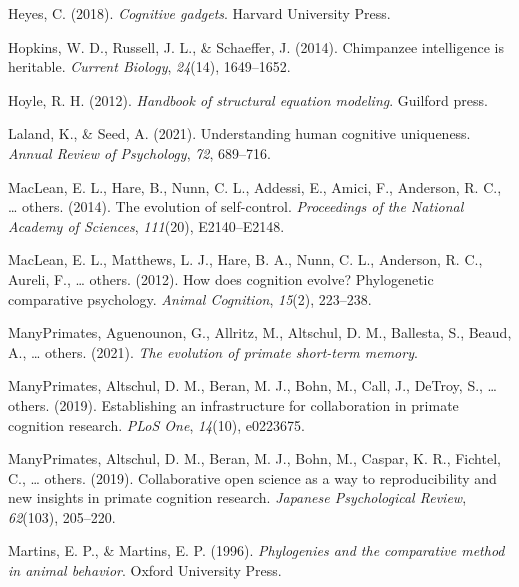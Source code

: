 \documentclass[
  man,floatsintext]{apa6}
\newlength{\cslhangindent}
\newlength{\cslentryspacingunit} %
\newenvironment{CSLReferences}[2] %
 {%
  \setlength{\parindent}{0pt}
  \ifodd #1
  \let\oldpar\par
  \def\par{\hangindent=\cslhangindent\oldpar}
  \fi
  \setlength{\parskip}{#2\cslentryspacingunit}
 }%
 {}
\begin{document}
\begin{CSLReferences}{1}{0}
\leavevmode{}%
Heyes, C. (2018). \emph{Cognitive gadgets}. Harvard University Press.

\leavevmode{}%
Hopkins, W. D., Russell, J. L., \& Schaeffer, J. (2014). Chimpanzee intelligence is heritable. \emph{Current Biology}, \emph{24}(14), 1649--1652.

\leavevmode{}%
Hoyle, R. H. (2012). \emph{Handbook of structural equation modeling}. Guilford press.

\leavevmode{}%
Laland, K., \& Seed, A. (2021). Understanding human cognitive uniqueness. \emph{Annual Review of Psychology}, \emph{72}, 689--716.

\leavevmode{}%
MacLean, E. L., Hare, B., Nunn, C. L., Addessi, E., Amici, F., Anderson, R. C., \ldots{} others. (2014). The evolution of self-control. \emph{Proceedings of the National Academy of Sciences}, \emph{111}(20), E2140--E2148.

\leavevmode{}%
MacLean, E. L., Matthews, L. J., Hare, B. A., Nunn, C. L., Anderson, R. C., Aureli, F., \ldots{} others. (2012). How does cognition evolve? Phylogenetic comparative psychology. \emph{Animal Cognition}, \emph{15}(2), 223--238.

\leavevmode{}%
ManyPrimates, Aguenounon, G., Allritz, M., Altschul, D. M., Ballesta, S., Beaud, A., \ldots{} others. (2021). \emph{The evolution of primate short-term memory}.

\leavevmode{}%
ManyPrimates, Altschul, D. M., Beran, M. J., Bohn, M., Call, J., DeTroy, S., \ldots{} others. (2019). Establishing an infrastructure for collaboration in primate cognition research. \emph{PLoS One}, \emph{14}(10), e0223675.

\leavevmode{}%
ManyPrimates, Altschul, D. M., Beran, M. J., Bohn, M., Caspar, K. R., Fichtel, C., \ldots{} others. (2019). Collaborative open science as a way to reproducibility and new insights in primate cognition research. \emph{Japanese Psychological Review}, \emph{62}(103), 205--220.

\leavevmode{}%
Martins, E. P., \& Martins, E. P. (1996). \emph{Phylogenies and the comparative method in animal behavior}. Oxford University Press.


\end{CSLReferences}
\end{document}

